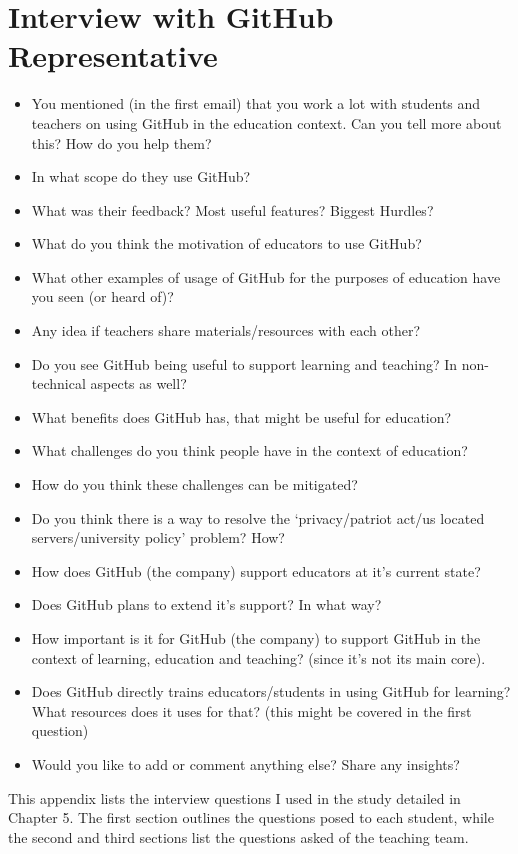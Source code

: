 \section{Interview with GitHub Representative}
\begin{itemize}
    \item You mentioned (in the first email) that you work a lot with students and teachers on using GitHub in the education context. Can you tell more about this? How do you help them?
    \item In what scope do they use GitHub?
    \item What was their feedback? Most useful features? Biggest Hurdles?
    \item What do you think the motivation of educators to use GitHub?
    \item What other examples of usage of GitHub for the purposes of education have you seen (or heard of)?
    \item Any idea if teachers share materials/resources with each other?
    \item Do you see GitHub being useful to support learning and teaching? In non-technical aspects as well?
    \item What benefits does GitHub has, that might be useful for education?
    \item What challenges do you think people have in the context of education?
    \item How do you think these challenges can be mitigated?
    \item Do you think there is a way to resolve the `privacy/patriot act/us located servers/university policy' problem? How?
    \item How does GitHub (the company) support educators at it's current state?
    \item Does GitHub plans to extend it's support? In what way?
    \item How important is it for GitHub (the company) to support GitHub in the context of learning, education and teaching? (since it's not its main core).
    \item Does GitHub directly trains educators/students in using GitHub for learning? What resources does it uses for that? (this might be covered in the first question)
    \item Would you like to add or comment anything else? Share any insights?
\end{itemize}

This appendix lists the interview questions I used in the study detailed in Chapter 5. The first section outlines the questions posed to each student, while the second and third sections list the questions asked of the teaching team.

